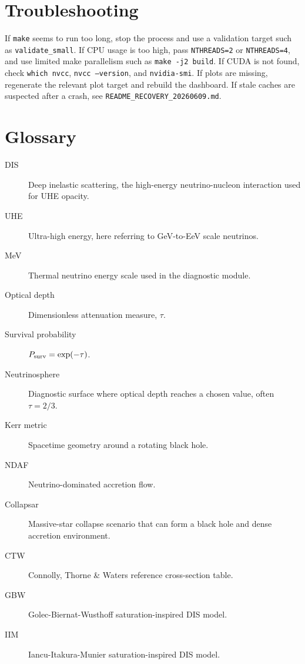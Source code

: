 \documentclass[11pt,a4paper]{article}
\begin{document}
\section{Troubleshooting}

If \texttt{make} seems to run too long, stop the process and use a validation
target such as \texttt{validate\_small}. If CPU usage is too high, pass
\texttt{NTHREADS=2} or \texttt{NTHREADS=4}, and use limited make parallelism
such as \texttt{make -j2 build}. If CUDA is not found, check \texttt{which
nvcc}, \texttt{nvcc --version}, and \texttt{nvidia-smi}. If plots are missing,
regenerate the relevant plot target and rebuild the dashboard. If stale caches
are suspected after a crash, see \texttt{README\_RECOVERY\_20260609.md}.

\section{Glossary}

\begin{description}
\item[DIS] Deep inelastic scattering, the high-energy neutrino-nucleon
interaction used for UHE opacity.
\item[UHE] Ultra-high energy, here referring to GeV-to-EeV scale neutrinos.
\item[MeV] Thermal neutrino energy scale used in the diagnostic module.
\item[Optical depth] Dimensionless attenuation measure, $\tau$.
\item[Survival probability] $P_{\rm surv}=\exp(-\tau)$.
\item[Neutrinosphere] Diagnostic surface where optical depth reaches a chosen
value, often $\tau=2/3$.
\item[Kerr metric] Spacetime geometry around a rotating black hole.
\item[NDAF] Neutrino-dominated accretion flow.
\item[Collapsar] Massive-star collapse scenario that can form a black hole and
dense accretion environment.
\item[CTW] Connolly, Thorne \& Waters reference cross-section table.
\item[GBW] Golec-Biernat-Wusthoff saturation-inspired DIS model.
\item[IIM] Iancu-Itakura-Munier saturation-inspired DIS model.
\end{description}
\end{document}
